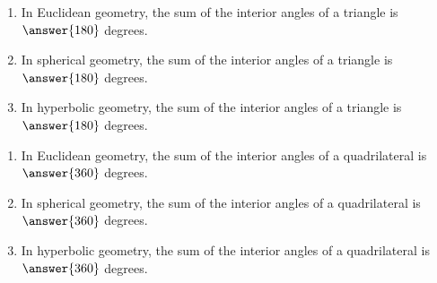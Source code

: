 \documentclass[nooutcomes]{ximera}
\begin{document}

\begin{problem}
\begin{enumerate}
\item In Euclidean geometry, the sum of the interior angles of a triangle is 
$\answer{180}$ degrees.
\item In spherical geometry, the sum of the interior angles of a triangle is 
$\answer{180}$ degrees.
\item In hyperbolic geometry, the sum of the interior angles of a triangle is 
$\answer{180}$ degrees.
\end{enumerate}
\end{problem}

\begin{problem}
\begin{enumerate}
\item In Euclidean geometry, the sum of the interior angles of a quadrilateral is 
$\answer{360}$ degrees.
\item In spherical geometry, the sum of the interior angles of a quadrilateral is 
$\answer{360}$ degrees.
\item In hyperbolic geometry, the sum of the interior angles of a quadrilateral is 
$\answer{360}$ degrees.
\end{enumerate}
\end{problem}
\end{document}
